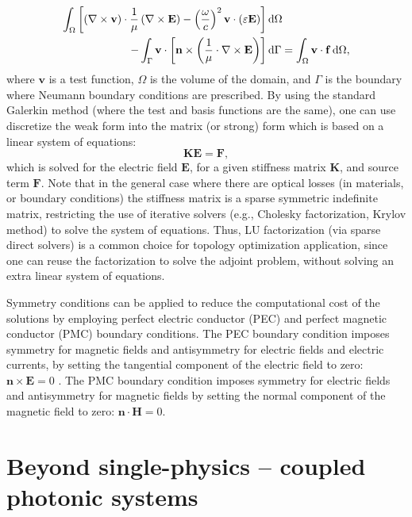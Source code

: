    \begin{align}
        \int_\Omega \left[ \left( \nabla \times \mathbf{v} \right) \cdot
            \frac{1}{\mu} \left( \nabla \times \mathbf{E} \right)- \left(\frac{\omega}{c}\right)^2 \mathbf{v}\cdot(\varepsilon\mathbf{E})\right]& \mathop{}\!\text{d} \Omega \\
        - \int_\Gamma \mathbf{v} \cdot \left[ \mathbf{n} \times \left(
            \frac{1}{\mu} \cdot \nabla \times \mathbf{E} \right) \right]& \mathop{}\!\text{d} \Gamma 
        = \int_\Omega \mathbf{v} \cdot \mathbf{f} \mathop{}\!\text{d} \Omega,
    \end{align}
    where $\mathbf{v}$ is a test function, $\Omega$ is the volume of the domain,
    and $\Gamma$ is the boundary where Neumann boundary conditions
    are prescribed. By using
    the standard Galerkin method (where the test and basis functions are the same),
    one can use discretize the weak form
    into the matrix (or strong) form which is based on a linear system of equations:
    \begin{equation}\label{eq:discretized}
        \mathbf{K} \mathbf{E} = \mathbf{F},
    \end{equation}
    which is solved for the electric field $\mathbf{E}$, for a given stiffness matrix $\mathbf{K}$, and
    source term $\mathbf{F}$. Note that in the general case where there are optical losses (in materials, or boundary conditions) the stiffness matrix is a sparse symmetric indefinite matrix,
    restricting the use of iterative solvers
    (e.g., Cholesky factorization, Krylov method) to solve the system of equations.
    Thus, LU factorization (via sparse direct solvers) is
    a common choice for topology optimization application, since one can reuse the factorization to solve
    the adjoint problem, without solving an extra linear system of equations.

    Symmetry conditions can be applied to reduce the computational
    cost of the solutions by employing perfect electric conductor (PEC) and perfect
    magnetic
    conductor (PMC) boundary conditions. The PEC boundary condition
    imposes symmetry for magnetic fields and antisymmetry for electric fields and
    electric
    currents, by setting the tangential component of the electric field to zero:
$\mathbf{n}\times \mathbf{E} = 0$ .
    The PMC boundary condition imposes symmetry for electric fields and
    antisymmetry for magnetic fields
    by setting the normal component of the magnetic field to zero: $\mathbf{n}\cdot
\mathbf{H} = 0$.

    \section{Beyond single-physics -- coupled photonic systems}\label{sec:coupled}

